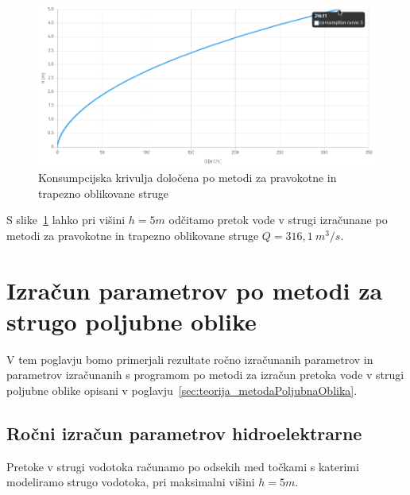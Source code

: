 \begin{figure}[H]
	\begin{centering}
		\includegraphics[width=\textwidth]{slike/izracuni/trapezna_konsumpcijska.png}\caption{Konsumpcijska krivulja določena po metodi za pravokotne in trapezno oblikovane struge}\label{fig:trapeznaMetoda_konsumpcijskaKrivulja}
	\end{centering}
\end{figure}



S slike~\ref{fig:trapeznaMetoda_konsumpcijskaKrivulja} lahko pri višini $h=5m$ odčitamo pretok vode v strugi izračunane po metodi za pravokotne in trapezno oblikovane struge $Q = 316,1~m^3/s$. 


\section{Izračun parametrov po metodi za strugo poljubne oblike}\label{sec:izracun_numericnaMetoda}

V tem poglavju bomo primerjali rezultate ročno izračunanih parametrov in parametrov izračunanih s programom po metodi za izračun pretoka vode v strugi poljubne oblike opisani v poglavju~\ref{sec:teorija_metodaPoljubnaOblika}.


\subsection{Ročni izračun parametrov hidroelektrarne}\label{sec:izracun_rocno_numericnaMetoda}

Pretoke v strugi vodotoka računamo po odsekih med točkami s katerimi modeliramo strugo vodotoka, pri maksimalni višini $h=5m$.


